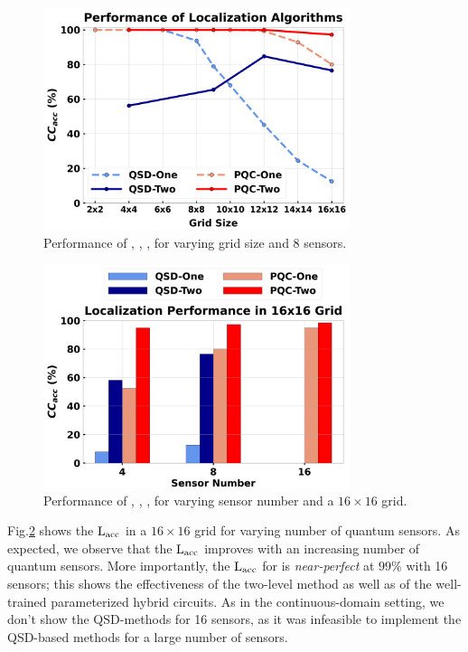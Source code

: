\begin{figure}[ht]
    \centering
    \includegraphics[width=0.8\textwidth]{chapters/qce/figures/discrete.varygrid.png}
    \caption{Performance of \povmone, \povm, \pqcone, \pqctwo for varying grid size and 8 sensors.}
    \label{fig:discrete.varygrid}
\end{figure}


\begin{figure}[ht]
    \centering
    \includegraphics[width=0.8\textwidth]{chapters/qce/figures/discrete.varysensornum.png}
    \caption{Performance of \povmone, \povm, \pqcone, \pqctwo for varying sensor number and a $16\times16$ grid.}
    \label{fig:discrete.varysen}
\end{figure}



Fig.\ref{fig:discrete.varysen} shows the $\mathrm{L_{acc}}$ in a $16\times16$ grid for varying number of quantum sensors. As expected, we observe that the $\mathrm{L_{acc}}$ improves with an increasing number of quantum sensors. More importantly, the $\mathrm{L_{acc}}$ for \pqctwo is {\em near-perfect} 
at $99\%$ with 16 sensors; this shows the effectiveness of the two-level method as well
as of the well-trained parameterized hybrid circuits. As in the continuous-domain setting, we don't show the QSD-methods for 16 sensors, as it was infeasible to implement the QSD-based methods for a large number of sensors.
